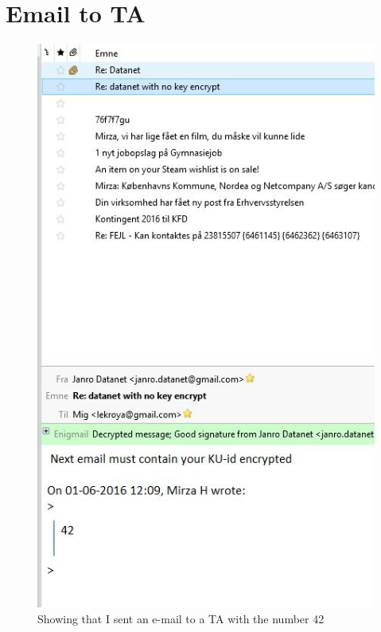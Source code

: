\documentclass{sig-alternate-05-2015}
\begin{document}
\section{Email to TA}
\begin{figure}[H]
  \centering
  \includegraphics[scale=1]{ft.jpg}
  \caption{Showing that I sent an e-mail to a TA with the number 42}
\end{figure}
\end{document}
